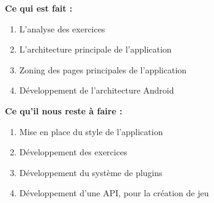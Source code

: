 \textbf{Ce qui est fait :}
\begin{enumerate}
\item L'analyse des exercices
\item L'architecture principale de l'application
\item Zoning des pages principales de l'application
\item Développement de l'architecture Android
\end{enumerate}

\textbf{Ce qu'il nous reste à faire :}
\begin{enumerate}
\item Mise en place du style de l'application
\item Développement des exercices
\item Développement du système de plugins
\item Développement d'une API, pour la création de jeu
\end{enumerate}